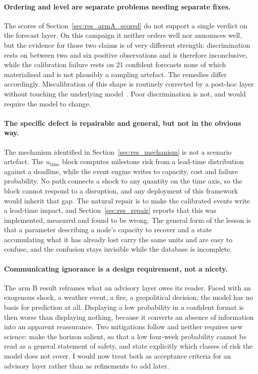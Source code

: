 \paragraph{Ordering and level are separate problems needing separate fixes.}
The scores of Section~\ref{sec:res_armA_scored} do not support a single verdict on the
forecast layer. On this campaign it neither orders well nor announces well, but the
evidence for those two claims is of very different strength: discrimination rests on between
two and six positive observations and is therefore inconclusive, while the calibration
failure rests on 21 confident forecasts none of which materialised and is not plausibly a
sampling artefact. The remedies differ accordingly. Miscalibration of this shape is
routinely corrected by a post-hoc layer without touching the underlying
model~\autocite{niculescu2005predicting,guo2017calibration}. Poor discrimination is not, and
would require the model to change.

\paragraph{The specific defect is repairable and general, but not in the obvious way.}
The mechanism identified in Section~\ref{sec:res_mechanism} is not a scenario artefact. The
$u_{\text{time}}$ block computes milestone risk from a lead-time distribution against a
deadline, while the event engine writes to capacity, cost and failure probability. No path
connects a shock to any quantity on the time axis, so the block cannot respond to a
disruption, and any deployment of this framework would inherit that gap. The natural repair is to make the calibrated events write a lead-time impact, and
Section~\ref{sec:res_repair} reports that this was implemented, measured and found to be
wrong. The general form of the lesson is that a parameter describing a node's capacity to
recover and a state accumulating what it has already lost carry the same units and are easy to
confuse, and the confusion stays invisible while the database is incomplete.

\paragraph{Communicating ignorance is a design requirement, not a nicety.}
The arm B result reframes what an advisory layer owes its reader. Faced with an exogenous
shock, a weather event, a fire, a geopolitical decision, the model has no basis for
prediction at all. Displaying a low probability in a confident format is then worse than
displaying nothing, because it converts an absence of information into an apparent
reassurance. Two mitigations follow and neither requires new science: make the
horizon salient, so that a low four-week probability cannot be read as a general statement of
safety, and state explicitly which classes of risk the model does not cover. I would now treat
both as acceptance criteria for an advisory layer rather than as refinements to add later.


